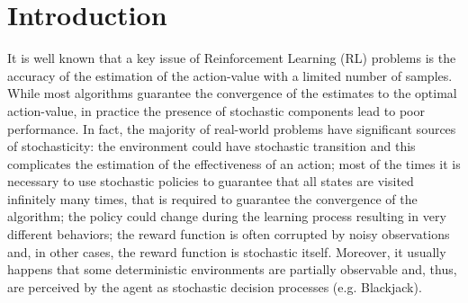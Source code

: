 \documentclass[conference]{IEEEtran}
\begin{document}
\section{Introduction}
It is well known that a key issue of Reinforcement Learning (RL) problems is the accuracy of the estimation of the action-value with a limited number of samples. While most algorithms guarantee the convergence of the estimates to the optimal action-value, in practice the presence of stochastic components lead to poor performance. In fact, the majority of real-world problems have significant sources of stochasticity: the environment could have stochastic transition and this complicates the estimation of the effectiveness of an action; most of the times it is necessary to use stochastic policies to guarantee that all states are visited infinitely many times, that is required to guarantee the convergence of the algorithm; the policy could change during the learning process resulting in very different behaviors; the reward function is often corrupted by noisy observations and, in other cases, the reward function is stochastic itself. Moreover, it usually happens that some deterministic environments are partially observable and, thus, are perceived by the agent as stochastic decision processes (e.g. Blackjack).
\end{document}
